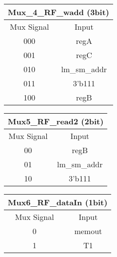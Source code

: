 \documentclass[11pt,fleqn,oneside]{book} %
\begin{document}
\vspace{0.5cm}
\begin{multicols}{3}

\begin{center}
 \begin{tabular}{||c|c||} 
 \hline
 \multicolumn{2}{|c|}{Mux\_4\_RF\_wadd (3bit)} \\
 \hline
 Mux Signal & Input \\ [0.5ex] 
 \hline\hline
 000 & regA  \\ 
 \hline
 001 & regC  \\
 \hline
 010 & lm\_sm\_addr  \\
 \hline
 011 & 3'b111  \\
 \hline
 100 & regB \\ [1ex] 
 \hline
\end{tabular}
\end{center}

\begin{center}
 \begin{tabular}{||c|c||} 
 \hline
 \multicolumn{2}{|c|}{Mux5\_RF\_read2 (2bit)} \\
 \hline
 Mux Signal & Input \\ [0.5ex] 
 \hline\hline
 00 & regB  \\ 
 \hline
 01 & lm\_sm\_addr  \\
 \hline
 10 & 3'b111  \\ [1ex] 
 \hline
\end{tabular}
\end{center}


\begin{center}
 \begin{tabular}{||c|c||} 
 \hline
 \multicolumn{2}{|c|}{Mux6\_RF\_dataIn (1bit)} \\
 \hline
 Mux Signal & Input \\ [0.5ex] 
 \hline\hline
 0 & memout  \\ 
 \hline
 1 & T1  \\ [1ex] 
 \hline
\end{tabular}
\end{center}
\end{multicols}
\vspace{0.5cm}
\end{document}
